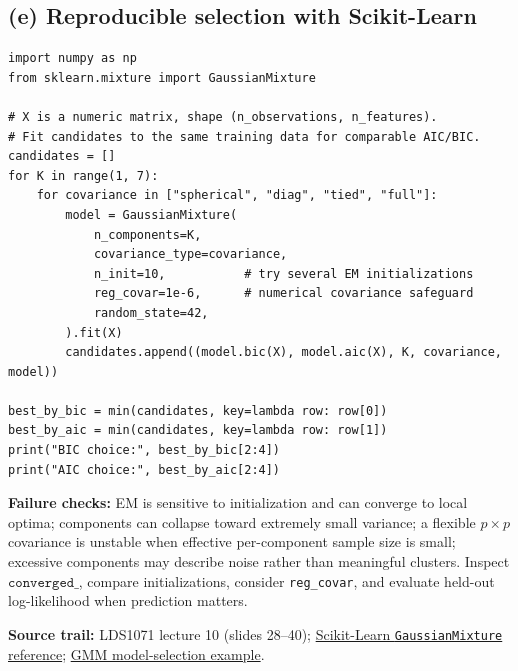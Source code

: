 \subsection*{(e) Reproducible selection with Scikit-Learn}
\begin{lstlisting}
import numpy as np
from sklearn.mixture import GaussianMixture

# X is a numeric matrix, shape (n_observations, n_features).
# Fit candidates to the same training data for comparable AIC/BIC.
candidates = []
for K in range(1, 7):
    for covariance in ["spherical", "diag", "tied", "full"]:
        model = GaussianMixture(
            n_components=K,
            covariance_type=covariance,
            n_init=10,           # try several EM initializations
            reg_covar=1e-6,      # numerical covariance safeguard
            random_state=42,
        ).fit(X)
        candidates.append((model.bic(X), model.aic(X), K, covariance, model))

best_by_bic = min(candidates, key=lambda row: row[0])
best_by_aic = min(candidates, key=lambda row: row[1])
print("BIC choice:", best_by_bic[2:4])
print("AIC choice:", best_by_aic[2:4])
\end{lstlisting}
\textbf{Failure checks:} EM is sensitive to initialization and can converge to local optima; components can collapse toward extremely small variance; a flexible $p\times p$ covariance is unstable when effective per-component sample size is small; excessive components may describe noise rather than meaningful clusters. Inspect $\texttt{converged\_}$, compare initializations, consider \texttt{reg\_covar}, and evaluate held-out log-likelihood when prediction matters.

\textbf{Source trail:} LDS1071 lecture 10 (slides 28--40); \href{https://scikit-learn.org/stable/modules/generated/sklearn.mixture.GaussianMixture.html}{Scikit-Learn \texttt{GaussianMixture} reference}; \href{https://scikit-learn.org/stable/auto_examples/mixture/plot_gmm_selection.html}{GMM model-selection example}.
